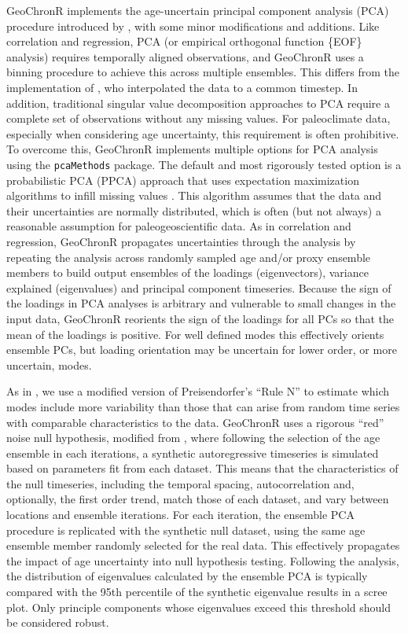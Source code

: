\documentclass[gchron, manuscript]{copernicus}
\begin{document}
GeoChronR implements the age-uncertain principal component analysis (PCA) procedure introduced by \citet{anchukaitis2013mceof}, with some minor modifications and additions.
Like correlation and regression, PCA (or empirical orthogonal function \{EOF\} analysis) requires temporally aligned observations, and GeoChronR uses a binning procedure to achieve this across multiple ensembles.
This differs from the implementation of \citet{anchukaitis2013mceof}, who interpolated the data to a common timestep.
In addition, traditional singular value decomposition approaches to PCA require a complete set of observations without any missing values.
For paleoclimate data, especially when considering age uncertainty, this requirement is often prohibitive.
To overcome this, GeoChronR implements multiple options for PCA analysis using the \texttt{pcaMethods} package.
The default and most rigorously tested option is a probabilistic PCA (PPCA) approach that uses expectation maximization algorithms to infill missing values \citep{roweis1998algorithms}.
This algorithm assumes that the data and their uncertainties are normally distributed, which is often (but not always) a reasonable assumption for paleogeoscientific data.
As in correlation and regression, GeoChronR propagates uncertainties through the analysis by repeating the analysis across randomly sampled age and/or proxy ensemble members to build output ensembles of the loadings (eigenvectors), variance explained (eigenvalues) and principal component timeseries.
Because the sign of the loadings in PCA analyses is arbitrary and vulnerable to small changes in the input data, GeoChronR reorients the sign of the loadings for all PCs so that the mean of the loadings is positive.
For well defined modes this effectively orients ensemble PCs, but loading orientation may be uncertain for lower order, or more uncertain, modes.

As in \citet{anchukaitis2013mceof}, we use a modified version of Preisendorfer's ``Rule N'' \citep{PreisendorferMobley1988} to estimate which modes include more variability than those that can arise from random time series with comparable characteristics to the data.
GeoChronR uses a rigorous ``red'' noise null hypothesis, modified from \citet{SchneiderNeumaier2001}, where following the selection of the age ensemble in each iterations, a synthetic autoregressive timeseries is simulated based on parameters fit from each dataset.
This means that the characteristics of the null timeseries, including the temporal spacing, autocorrelation and, optionally, the first order trend, match those of each dataset, and vary between locations and ensemble iterations.
For each iteration, the ensemble PCA procedure is replicated with the synthetic null dataset, using the same age ensemble member randomly selected for the real data.
This effectively propagates the impact of age uncertainty into null hypothesis testing.
Following the analysis, the distribution of eigenvalues calculated by the ensemble PCA is typically compared with the 95th percentile of the synthetic eigenvalue results in a scree plot.
Only principle components whose eigenvalues exceed this threshold should be considered robust.
\end{document}
